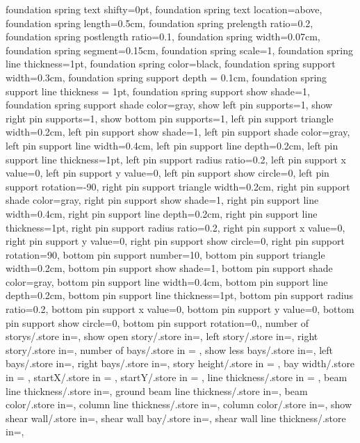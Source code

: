 {{foundation spring text shifty=0pt,
foundation spring text location=above,
foundation spring length=0.5cm,
foundation spring prelength ratio=0.2,
foundation spring postlength ratio=0.1,
foundation spring width=0.07cm,
foundation spring segment=0.15cm,
foundation spring scale=1,
foundation spring line thickness=1pt,
foundation spring color=black,
foundation spring support width=0.3cm,
foundation spring support depth = 0.1cm,
foundation spring support line thickness = 1pt,
foundation spring support show shade=1,
foundation spring support shade color=gray,
show left pin supports=1,
show right pin supports=1,
show bottom pin supports=1,
left pin support triangle width=0.2cm,
left pin support show shade=1,
left pin support shade color=gray,
left pin support line width=0.4cm,
left pin support line depth=0.2cm,
left pin support line thickness=1pt,
left pin support radius ratio=0.2,
left pin support x value=0,
left pin support y value=0,
left pin support show circle=0,
left pin support rotation=-90,
right pin support triangle width=0.2cm,
right pin support shade color=gray,
right pin support show shade=1,
right pin support line width=0.4cm,
right pin support line depth=0.2cm,
right pin support line thickness=1pt,
right pin support radius ratio=0.2,
right pin support x value=0,
right pin support y value=0,
right pin support show circle=0,
right pin support rotation=90,
bottom pin support number=10,
bottom pin support triangle width=0.2cm,
bottom pin support show shade=1,
bottom pin support shade color=gray,
bottom pin support line width=0.4cm,
bottom pin support line depth=0.2cm,
bottom pin support line thickness=1pt,
bottom pin support radius ratio=0.2,
bottom pin support x value=0,
bottom pin support y value=0,
bottom pin support show circle=0,
bottom pin support rotation=0,},
number of storys/.store in=\storynumber,
show open story/.store in=\showopenstory,
left story/.store in=\leftstory,
right story/.store in=\rightstory,
number of bays/.store in = \baynumber,
show less bays/.store in=\showlessbays,
left bays/.store in=\leftbays,
right bays/.store in=\rightbays,
story height/.store in = \storyheight,
bay width/.store in = \baywidth,
startX/.store in = \startx,
startY/.store in = \starty,
line thickness/.store in = \linet,
beam line thickness/.store in=\beamlinet,
ground beam line thickness/.store in=\groundbeamlinet,
beam color/.store in=\beamcolor,
column line thickness/.store in=\collinet,
column color/.store in=\columncolor,
show shear wall/.store in=\showshearwall,
shear wall bay/.store in=\shearwallbay,
shear wall line thickness/.store in=\shearwalllinet,
}
